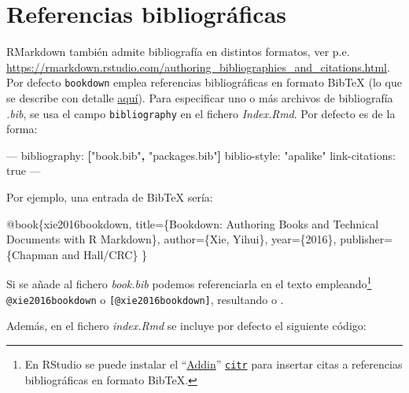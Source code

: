 \documentclass[]{book}
\newenvironment{Shaded}{\begin{snugshade}}{\end{snugshade}}
\newcommand{\KeywordTok}[1]{\textcolor[rgb]{0.13,0.29,0.53}{\textbf{#1}}}
\newcommand{\DataTypeTok}[1]{\textcolor[rgb]{0.13,0.29,0.53}{#1}}
\newcommand{\StringTok}[1]{\textcolor[rgb]{0.31,0.60,0.02}{#1}}
\newcommand{\OtherTok}[1]{\textcolor[rgb]{0.56,0.35,0.01}{#1}}
\newcommand{\FunctionTok}[1]{\textcolor[rgb]{0.00,0.00,0.00}{#1}}
\newcommand{\VariableTok}[1]{\textcolor[rgb]{0.00,0.00,0.00}{#1}}
\newcommand{\AttributeTok}[1]{\textcolor[rgb]{0.77,0.63,0.00}{#1}}
\newcommand{\NormalTok}[1]{#1}
\let\rmarkdownfootnote\footnote%
\def\footnote{\protect\rmarkdownfootnote}
\theoremstyle{definition}
\theoremstyle{definition}
\theoremstyle{definition}
\theoremstyle{remark}
\begin{document}
\section{Referencias bibliográficas}\label{biblio}

RMarkdown también admite bibliografía en distintos formatos, ver p.e.
\url{https://rmarkdown.rstudio.com/authoring_bibliographies_and_citations.html}.
Por defecto \texttt{bookdown} emplea referencias bibliográficas en
formato BibTeX (lo que se describe con detalle
\href{https://bookdown.org/yihui/bookdown/citations.html}{aquí}). Para
especificar uno o más archivos de bibliografía \emph{.bib}, se usa el
campo \texttt{bibliography} en el fichero \emph{Index.Rmd}. Por defecto
es de la forma:

\begin{Shaded}
\begin{Highlighting}[]
\OtherTok{---}
\FunctionTok{bibliography:}\AttributeTok{ }\KeywordTok{[}\StringTok{"book.bib"}\KeywordTok{,} \StringTok{"packages.bib"}\KeywordTok{]}
\FunctionTok{biblio-style:}\AttributeTok{ }\StringTok{"apalike"}
\FunctionTok{link-citations:}\AttributeTok{ true}
\OtherTok{---}
\end{Highlighting}
\end{Shaded}

Por ejemplo, una entrada de BibTeX sería:

\begin{Shaded}
\begin{Highlighting}[]
\VariableTok{@book}\NormalTok{\{}\OtherTok{xie2016bookdown}\NormalTok{,}
  \DataTypeTok{title}\NormalTok{=\{Bookdown: Authoring Books and Technical Documents with R Markdown\},}
  \DataTypeTok{author}\NormalTok{=\{Xie, Yihui\},}
  \DataTypeTok{year}\NormalTok{=\{2016\},}
  \DataTypeTok{publisher}\NormalTok{=\{Chapman and Hall/CRC\}}
\NormalTok{\}}
\end{Highlighting}
\end{Shaded}

Si se añade al fichero \emph{book.bib} podemos referenciarla en el texto
empleando\footnote{En RStudio se puede instalar el
  ``\href{https://rstudio.github.io/rstudioaddins/}{Addin}''
  \href{https://github.com/crsh/citr}{\texttt{citr}} para insertar citas
  a referencias bibliográficas en formato BibTeX.}
\texttt{@xie2016bookdown} o \texttt{{[}@xie2016bookdown{]}}, resultando
\citet{xie2016bookdown} o \citep{xie2016bookdown}.

Además, en el fichero \emph{index.Rmd} se incluye por defecto el
siguiente código:
\end{document}
